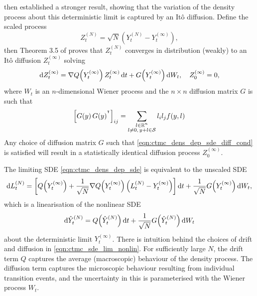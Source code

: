 \citet{Kurtz_1971_LimitTheoremsSequences} then established a stronger result, showing that the variation of the density process about this deterministic limit is captured by an It\^o diffusion.
Define the scaled process
\[
	Z_t^{(N)} = \sqrt{N}\left(Y_t^{(N)} - Y_{t}^{(\infty)}\right),
\]
then Theorem 3.5 of \citet{Kurtz_1971_LimitTheoremsSequences} proves that \(Z_t^{(N)}\) converges in distribution (weakly) to an It\^o diffusion \(Z_t^{(\infty)}\) solving
\begin{equation}
	\dif Z_t^{(\infty)} = \nabla Q\!\left(Y_t^{(\infty)}\right) Z_t^{(\infty)}\dif t + G\!\left(Y_t^{(\infty)}\right)\dif W_t, \quad Z_0^{(\infty)} = 0,
	\label{eqn:ctmc_dens_dep_sde}
\end{equation}
where \(W_t\) is an \(n\)-dimensional Wiener process and the \(n \times n\) diffusion matrix \(G\) is such that
\begin{equation}
	\left[G\!\left(y\right)G\!\left(y\right)^{^{\intercal}}\right]_{ij} = \sum_{\substack{l \in \mathbb{R}^n \\ l \neq 0,\, y + l \in \mathcal{S}}}{l_i l_j f\!\left(y,l\right)}
	\label{eqn:ctmc_dens_dep_sde_diff_cond}
\end{equation}
Any choice of diffusion matrix \(G\) such that \cref{eqn:ctmc_dens_dep_sde_diff_cond} is satisfied will result in a statistically identical diffusion process \(Z_0^{(\infty)}\).

The limiting SDE \cref{eqn:ctmc_dens_dep_sde} is equivalent to the unscaled SDE
\begin{equation}
	\dif L_t^{(N)} = \left[Q\!\left(Y_t^{(\infty)}\right) + \frac{1}{\sqrt{N}} \nabla Q\!\left(Y_t^{(\infty)}\right)\left(L_t^{(N)} - Y_t^{(\infty)}\right)\right]\dif t + \frac{1}{\sqrt{N}}G\!\left(Y_t^{(\infty)}\right)\dif W_t,
	\label{eqn:ctmc_sde_lin_lim}
\end{equation}
which is a linearisation of the nonlinear SDE
\begin{equation}
	\dif \hat{Y}^{(N)}_t = Q\!\left(\hat{Y}^{(N)}_t\right)\dif t + \frac{1}{\sqrt{N}}G\!\left(\hat{Y}_t^{(N)}\right)\dif W_t
	\label{eqn:ctmc_sde_lim_nonlin}
\end{equation}
about the deterministic limit \(Y_t^{(\infty)}\).
There is intuition behind the choices of drift and diffusion in \cref{eqn:ctmc_sde_lim_nonlin}.
For sufficiently large \(N\), the drift term \(Q\) captures the average (macroscopic) behaviour of the density process.
The diffusion term captures the microscopic behaviour resulting from individual transition events, and the uncertainty in this is parameterised with the Wiener process \(W_t\).




